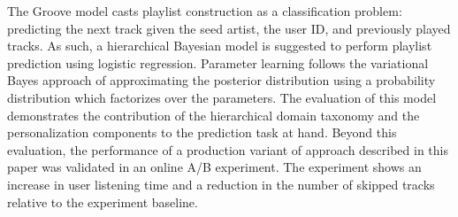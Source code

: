 The Groove model casts playlist construction as a classification problem: predicting the next track given the seed artist, the user ID, and previously played tracks. 
As such, a hierarchical Bayesian model is suggested to perform playlist prediction using logistic regression. 
Parameter learning follows the variational Bayes approach of approximating the posterior distribution using a probability distribution which factorizes over the parameters. 
The evaluation of this model demonstrates the contribution of the hierarchical domain taxonomy and the personalization components to the prediction task at hand. 
Beyond this evaluation, the performance of a production variant of approach described in this paper was validated in an online A/B experiment. The experiment shows an increase in user listening time and a reduction in the number of skipped tracks relative to the experiment baseline.




